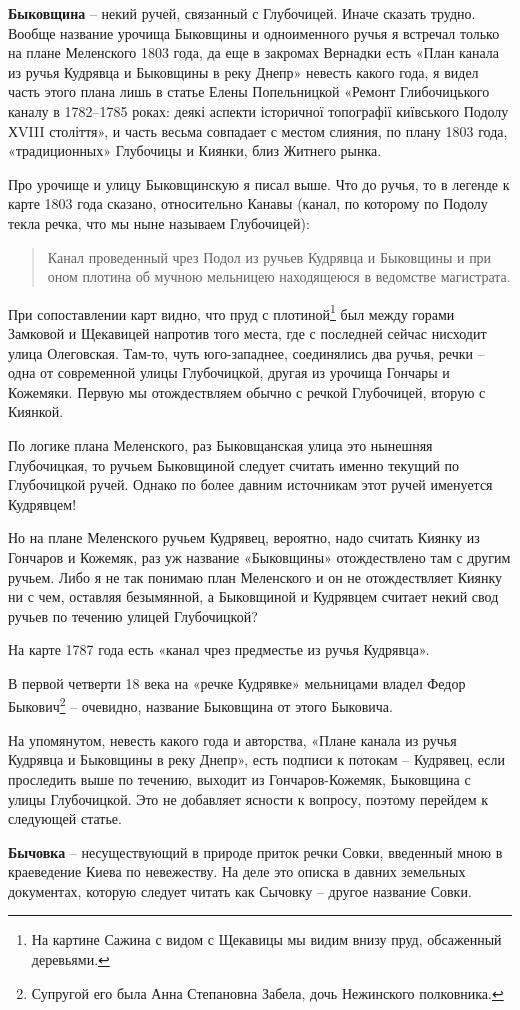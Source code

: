 \medskip

\textbf{Быковщина} – некий ручей, связанный с Глубочицей. Иначе сказать трудно. Вообще название урочища Быковщины и одноименного ручья я встречал только на плане Меленского 1803 года, да еще в закромах Вернадки есть «План канала из ручья Кудрявца и Быковщины в реку Днепр» невесть какого года, я видел часть этого плана лишь в статье Елены Попельницкой «Ремонт Глибочицького каналу в 1782–1785 роках: деякі аспекти історичної топографії київського Подолу ХVIII століття», и часть весьма совпадает с местом слияния, по плану 1803 года, «традиционных» Глубочицы и Киянки, близ Житнего рынка.

Про урочище и улицу Быковщинскую я писал выше. Что до ручья, то в легенде к карте 1803 года сказано, относительно Канавы (канал, по которому по Подолу текла речка, что мы ныне называем Глубочицей):

\begin{quotation}
Канал проведенный чрез Подол из ручьев Кудрявца и Быковщины и при оном плотина об мучною мельницею находящеюся в ведомстве магистрата.
\end{quotation}

При сопоставлении карт видно, что пруд с плотиной\footnote{На картине Сажина с видом с Щекавицы мы видим внизу пруд, обсаженный деревьями.} был между горами Замковой и Щекавицей напротив того места, где с последней сейчас нисходит улица Олеговская. Там-то, чуть юго-западнее, соединялись два ручья, речки – одна от современной улицы Глубочицкой, другая из урочища Гончары и Кожемяки. Первую мы отождествляем обычно с речкой Глубочицей, вторую с Киянкой.

По логике плана Меленского, раз Быковщанская улица это нынешняя Глубочицкая, то ручьем Быковщиной следует считать именно текущий по Глубочицкой ручей. Однако по более давним источникам этот ручей именуется Кудрявцем!

Но на плане Меленского ручьем Кудрявец, вероятно, надо считать Киянку из Гончаров и Кожемяк, раз уж название «Быковщины» отождествлено там с другим ручьем. Либо я не так понимаю план Меленского и он не отождествляет Киянку ни с чем, оставляя безымянной, а Быковщиной и Кудрявцем считает некий свод ручьев по течению улицей Глубочицкой?

На карте 1787 года есть «канал чрез предместье из ручья Кудрявца».

В первой четверти 18 века на «речке Кудрявке» мельницами владел Федор Быкович\footnote{Супругой его была Анна Степановна Забела, дочь Нежинского полковника.} – очевидно, название Быковщина от этого Быковича.

На упомянутом, невесть какого года и авторства, «Плане канала из ручья Кудрявца и Быковщины в реку Днепр», есть подписи к потокам – Кудрявец, если проследить выше по течению, выходит из Гончаров-Кожемяк, Быковщина с улицы Глубочицкой. Это не добавляет ясности к вопросу, поэтому перейдем к следующей статье.\\

\medskip

\textbf{Бычовка} – несуществующий в природе приток речки Совки, введенный мною в краеведение Киева по невежеству. На деле это описка в давних земельных документах, которую следует читать как Сычовку – другое название Совки.
